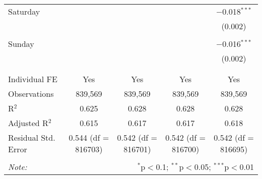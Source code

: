 \documentclass[
]{article}
\begin{document}
\begin{table}[!htbp]
{\begin{tabular}{@{\extracolsep{5pt}}lcccc}
 Saturday &  &  &  & $-$0.018$^{***}$ \\ 
  &  &  &  & (0.002) \\ 
  & & & & \\ 
 Sunday &  &  &  & $-$0.016$^{***}$ \\ 
  &  &  &  & (0.002) \\ 
  & & & & \\ 
\hline \\[-1.8ex] 
Individual FE & Yes & Yes & Yes & Yes \\ 
Observations & 839,569 & 839,569 & 839,569 & 839,569 \\ 
R$^{2}$ & 0.625 & 0.628 & 0.628 & 0.628 \\ 
Adjusted R$^{2}$ & 0.615 & 0.617 & 0.617 & 0.618 \\ 
Residual Std. Error & 0.544 (df = 816703) & 0.542 (df = 816701) & 0.542 (df = 816700) & 0.542 (df = 816695) \\ 
\hline 
\hline \\[-1.8ex] 
\textit{Note:}  & \multicolumn{4}{r}{$^{*}$p$<$0.1; $^{**}$p$<$0.05; $^{***}$p$<$0.01} \\ 
\end{tabular}
} 
\end{table} 
\newpage
\end{document}
